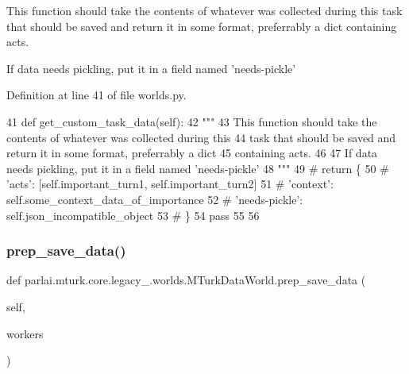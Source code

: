 \begin{DoxyVerb}This function should take the contents of whatever was collected during this
task that should be saved and return it in some format, preferrably a dict
containing acts.

If data needs pickling, put it in a field named 'needs-pickle'
\end{DoxyVerb}
 

Definition at line 41 of file worlds.\+py.


\begin{DoxyCode}
41     \textcolor{keyword}{def }get\_custom\_task\_data(self):
42         \textcolor{stringliteral}{"""}
43 \textcolor{stringliteral}{        This function should take the contents of whatever was collected during this}
44 \textcolor{stringliteral}{        task that should be saved and return it in some format, preferrably a dict}
45 \textcolor{stringliteral}{        containing acts.}
46 \textcolor{stringliteral}{}
47 \textcolor{stringliteral}{        If data needs pickling, put it in a field named 'needs-pickle'}
48 \textcolor{stringliteral}{        """}
49         \textcolor{comment}{# return \{}
50         \textcolor{comment}{#     'acts': [self.important\_turn1, self.important\_turn2]}
51         \textcolor{comment}{#     'context': self.some\_context\_data\_of\_importance}
52         \textcolor{comment}{#     'needs-pickle': self.json\_incompatible\_object}
53         \textcolor{comment}{# \}}
54         \textcolor{keywordflow}{pass}
55 
56 
\end{DoxyCode}
\mbox{\label{classparlai_1_1mturk_1_1core_1_1legacy__2018_1_1worlds_1_1MTurkDataWorld_ab0fd2eeab0ed799e565c5e97694cd135}} 
\subsubsection{\texorpdfstring{prep\+\_\+save\+\_\+data()}{prep\_save\_data()}}
{\footnotesize\ttfamily def parlai.\+mturk.\+core.\+legacy\+\_.\+worlds.\+M\+Turk\+Data\+World.\+prep\+\_\+save\+\_\+data (\begin{DoxyParamCaption}\item[{}]{self,  }\item[{}]{workers }\end{DoxyParamCaption})}

